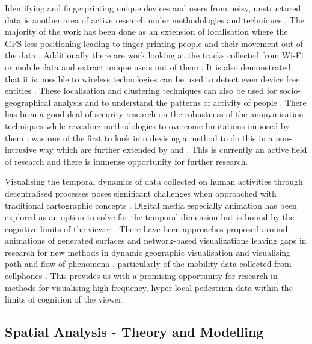 Identifying and fingerprinting unique devices and users from noisy, unstructured data is another area of active research under methodologies and techniques \cite{jiang2006, liao2006}.
The majority of the work has been done as an extension of localisation where the GPS-less positioning leading to finger printing people and their movement out of the data \citep{pang2007a, pappalardo2015}.
Additionally there are work looking at the tracks collected from Wi-Fi or mobile data and extract unique users out of them \citep{girardin2008, eagle2009, jiang2012}.
It is also demonstrated that it is possible to wireless technologies can be used to detect even device free entities \citep{elgohary2013}.
These localisation and clustering techniques can also be used for socio-geographical analysis and to understand the patterns of activity of people \citep{licoppe2008}.
There has been a good deal of security research on the robustness of the anonymisation techniques while revealing methodologies to overcome limitations imposed by them \citep{mathieucunche2016, chothia2010, krumm2007}.
\citet{cheng2016} was one of the first to look into devising a method to do this in a non-intrusive way which are further extended by \citet{di2016, adamsky2018} and \citet{dai2019}.
This is currently an active field of research and there is immense opportunity for further research.

Visualising the temporal dynamics of data collected on human activities through decentralised processes poses significant challenges when approached with traditional cartographic concepts \cite[-4cm]{maceachren2001, hallisey2005}.
Digital media especially animation has been explored as an option to solve for the temporal dimension \citep{morrison2000, lobben2003} but is bound by the cognitive limits of the viewer \citep{harrower2007}.
There have been approaches proposed around animations of generated surfaces \citep{kobayashi2011} and network-based visualizations \citep{ferrara2014} leaving gaps in research for new methods in dynamic geographic visualisation \citep{fabrikant2005} and visualising path and flow of phenomena \citep{thomas2005}, particularly of the mobility data collected from cellphones \citep{sbodio2014}.
This provides us with a promising opportunity for research in methods for visualising high frequency, hyper-local pedestrian data within the limits of cognition of the viewer.

\subsection{Spatial Analysis - Theory and Modelling}

